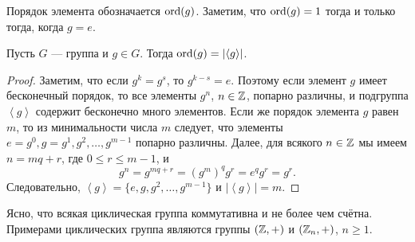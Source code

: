 Порядок элемента обозначается $\operatorname{\mathop{\mathrm{ord}}}(g)$. Заметим, что $\operatorname{\mathop{\mathrm{ord}}}(g) = 1$ тогда и только тогда, когда $g = e$.

\begin{proposal}
    Пусть $G$ --- группа и $g \in G$. Тогда $\operatorname{\mathop{\mathrm{ord}}}(g) = \left|\left< g \right>\right|$.
\end{proposal}

\begin{proof}
    Заметим, что если $g^{k} = g^{s}$, то $g^{k - s} = e$. Поэтому если элемент $g$ имеет бесконечный порядок, то все элементы $g^{n}$, $n \in \mathbb{Z}$, попарно различны, и подгруппа $\left< g \right>$ содержит бесконечно много элементов. Если же порядок элемента $g$ равен $m$, то из минимальности числа $m$ следует, что элементы $e = g^0, g = g^{1}, g^{2}, \dots, g^{m - 1}$ попарно различны. Далее, для всякого $n \in \mathbb{Z}$ мы имеем $n = mq + r$, где $0 \leq r \leq m - 1$, и 
    \begin{equation*}
        g^{n} = g^{mq + r} = \left(g^{m}\right)^{q} g^{r} = e^{q} g^{r} = g^{r}
    .\end{equation*}
    Следовательно, $\left< g \right> = \{e, g, g^2, \dots, g^{m - 1}\}$ и $\left|\left< g \right>\right| = m$.
\end{proof}

Ясно, что всякая циклическая группа коммутативна и не более чем счётна. Примерами циклических группа являются группы $(\mathbb{Z}, +)$ и $(\mathbb{Z}_n, +)$, $n \geq 1$.
